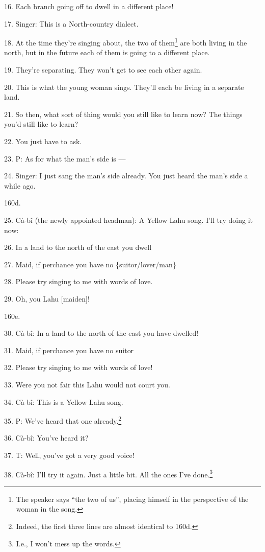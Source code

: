 16. Each branch going off to dwell in a different place!

17. Singer: This is a North-country dialect.

18. At the time they're singing about, the two of them\footnote{The speaker says ``the two of us'', placing himself in the perspective of the woman in the song.} are both living in the
north, but in the future each of them is going to a different place.

19. They're separating. They won't get to see each other again.

20. This is what the young woman sings. They'll each be living in a separate land.

21. So then, what sort of thing would you still like to learn now? The things you'd
still like to learn?

22. You just have to ask.

23. P: As for what the man's side is ---

24. Singer: I just sang the man's side already. You just heard the man's side a
while ago.

160d.

25. Cà-bî (the newly appointed headman): A Yellow Lahu song. I'll try doing it
now: 

26. In a land to the north of the east you dwell

27. Maid, if perchance you have no \{suitor/lover/man\}

28. Please try singing to me with words of love.

29. Oh, you Lahu [maiden]!

160e.

30. Cà-bî: In a land to the north of the east you have dwelled!

31. Maid, if perchance you have no suitor

32. Please try singing to me with words of love!

33. Were you not fair this Lahu would not court you.

34. Cà-bî: This is a Yellow Lahu song. 

35. P: We've heard that one already.\footnote{Indeed, the first three lines are almost identical to 160d.}

36. Cà-bî: You've heard it?

37. T: Well, you've got a very good voice!

38. Cà-bî: I'll try it again. Just a little bit. All the ones I've done.\footnote{I.e., I won't mess up the words.}

